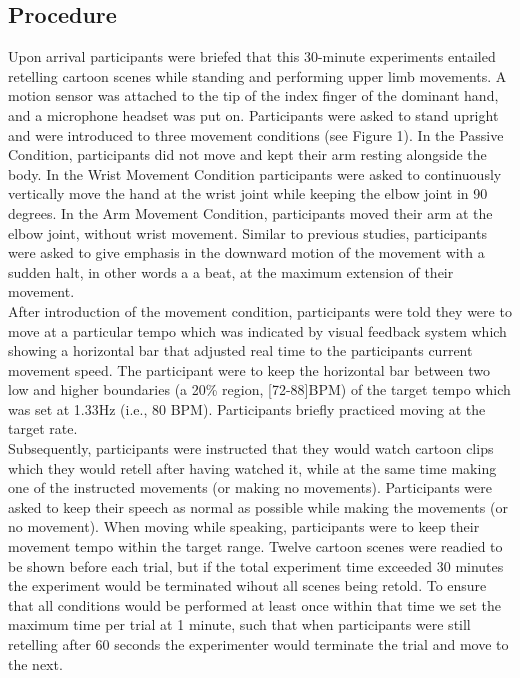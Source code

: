 \documentclass[
  man, noextraspace,floatsintext]{apa6}
\begin{document}
\hypertarget{procedure}{%
\subsection{Procedure}\label{procedure}}

Upon arrival participants were briefed that this 30-minute experiments entailed retelling cartoon scenes while standing and performing upper limb movements. A motion sensor was attached to the tip of the index finger of the dominant hand, and a microphone headset was put on. Participants were asked to stand upright and were introduced to three movement conditions (see Figure 1). In the Passive Condition, participants did not move and kept their arm resting alongside the body. In the Wrist Movement Condition participants were asked to continuously vertically move the hand at the wrist joint while keeping the elbow joint in 90 degrees. In the Arm Movement Condition, participants moved their arm at the elbow joint, without wrist movement. Similar to previous studies, participants were asked to give emphasis in the downward motion of the movement with a sudden halt, in other words a a beat, at the maximum extension of their movement.\\
After introduction of the movement condition, participants were told they were to move at a particular tempo which was indicated by visual feedback system which showing a horizontal bar that adjusted real time to the participants current movement speed. The participant were to keep the horizontal bar between two low and higher boundaries (a 20\% region, {[}72-88{]}BPM) of the target tempo which was set at 1.33Hz (i.e., 80 BPM). Participants briefly practiced moving at the target rate.\\
Subsequently, participants were instructed that they would watch cartoon clips which they would retell after having watched it, while at the same time making one of the instructed movements (or making no movements). Participants were asked to keep their speech as normal as possible while making the movements (or no movement). When moving while speaking, participants were to keep their movement tempo within the target range.
Twelve cartoon scenes were readied to be shown before each trial, but if the total experiment time exceeded 30 minutes the experiment would be terminated wihout all scenes being retold. To ensure that all conditions would be performed at least once within that time we set the maximum time per trial at 1 minute, such that when participants were still retelling after 60 seconds the experimenter would terminate the trial and move to the next.
\end{document}
